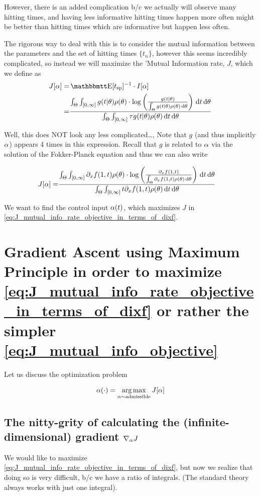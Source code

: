 \documentclass{article}
\begin{document}
However, there is an added complication b/c we actually will observe many
hitting times, and having less informative hitting times happen more often might
be better than hitting times which are informative but happen less often. 

The rigorous way to deal with this is to consider the mutual information between
the parameters and the set of hitting times $\{t_n\}$, however this seems
incredibly complicated, so instead we will maximize the 'Mutual Information
rate, $J$, which we define as 
\begin{align}
J[\a]= & \Exp[\ts]^{-1} \cdot I[\a]
\\
= & \frac{
\int_\Theta \int_{[0, \infty]} g(t|\th)  \rho(\th) \cdot 
\log \left( \frac{g(t|\th)}{\int_\Theta g(t|\th)\rho(\th) \intd{\th} } \right)
\intd{t}\intd{\th}}
{ \int_\Theta \int_{[0, \infty]} \t g(t|\th)\rho(\th) \intd{t}\intd{\th}}
\label{eq:J_mutual_info_rate_objective}
\end{align}

Well, this does NOT look any less complicated\ldots, Note that $g$ (and thus
implicitly ${\alpha}$) appears 4 times in this expression. Recall that $g$ is related
to ${\alpha}$ via the solution of the Fokker-Planck equation and thus we can also
write

\begin{align}
J[{\alpha}] 
= & \frac{
\int_\Theta \int_{[0, \infty]} {\partial}_xf(1, t)  \rho({\theta}) \cdot 
\log \left( \frac{{\partial}_xf(1, t)}{\int_\Theta {\partial}_xf(1, t)\rho({\theta}) \, \mathrm{d} {\theta} } \right)
\, \mathrm{d} t\, \mathrm{d} {\theta}}
{ \int_\Theta \int_{[0, \infty]} t {\partial}_xf(1, t)\rho({\theta}) \, \mathrm{d} t\, \mathrm{d} {\theta}}
\label{eq:J_mutual_info_rate_objective_in_terms_of_dixf} 
\end{align}
  
We want to find the control input ${\alpha}(t)$, which maximizes $J$ in
\cref{eq:J_mutual_info_rate_objective_in_terms_of_dixf}. 

\section{Gradient Ascent using Maximum Principle in order to maximize 
\cref{eq:J_mutual_info_rate_objective_in_terms_of_dixf} or rather the simpler 
\cref{eq:J_mutual_info_objective}} 

Let us discuss the optimization problem

$$
\a(\cdot) = \argmax_{\a \sim \textrm{admissible}} J[\a]
$$ 
   

\subsection{The nitty-grity of calculating the (infinite-dimensional) gradient
${ \nabla }_{{\alpha}} J$ } We would like to maximize
\cref{eq:J_mutual_info_rate_objective_in_terms_of_dixf}, but now we realize that
doing so is very difficult, b/c we have a ratio of integrals. (The standard
theory always works with just one integral).
\end{document}
